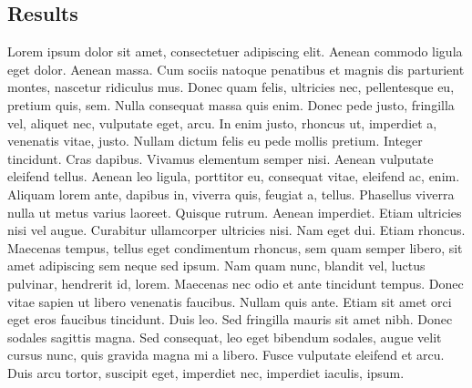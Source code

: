 \documentclass[a1paper, english]{article}
\begin{document}
\newpage

\begin{posterbox}
	\vspace{-10mm}
	\raggedright

	\section*{Results}
	Lorem ipsum dolor sit amet, consectetuer adipiscing elit. Aenean commodo ligula eget dolor. Aenean massa. Cum sociis natoque penatibus et magnis dis parturient montes, nascetur ridiculus mus. Donec quam felis, ultricies nec, pellentesque eu, pretium quis, sem. Nulla consequat massa quis enim. Donec pede justo, fringilla vel, aliquet nec, vulputate eget, arcu. In enim justo, rhoncus ut, imperdiet a, venenatis vitae, justo. Nullam dictum felis eu pede mollis pretium. Integer tincidunt. Cras dapibus. Vivamus elementum semper nisi. Aenean vulputate eleifend tellus. Aenean leo ligula, porttitor eu, consequat vitae, eleifend ac, enim. Aliquam lorem ante, dapibus in, viverra quis, feugiat a, tellus. Phasellus viverra nulla ut metus varius laoreet. Quisque rutrum. Aenean imperdiet. Etiam ultricies nisi vel augue. Curabitur ullamcorper ultricies nisi. Nam eget dui. Etiam rhoncus. Maecenas tempus, tellus eget condimentum rhoncus, sem quam semper libero, sit amet adipiscing sem neque sed ipsum. Nam quam nunc, blandit vel, luctus pulvinar, hendrerit id, lorem. Maecenas nec odio et ante tincidunt tempus. Donec vitae sapien ut libero venenatis faucibus. Nullam quis ante. Etiam sit amet orci eget eros faucibus tincidunt. Duis leo. Sed fringilla mauris sit amet nibh. Donec sodales sagittis magna. Sed consequat, leo eget bibendum sodales, augue velit cursus nunc, quis gravida magna mi a libero. Fusce vulputate eleifend et arcu. Duis arcu tortor, suscipit eget, imperdiet nec, imperdiet iaculis, ipsum.
\end{posterbox}

\vfill
\end{document}

